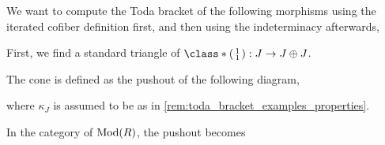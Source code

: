 \begin{example}
	\label{ex:toda_bracket_4}
	We want to compute the Toda bracket of the following morphisms using the iterated cofiber definition first, and then using the indeterminacy afterwards,
	\begin{center}
	\end{center}

	First, we find a standard triangle of \( \class*{\begin{psmallmatrix} 1 \\ 1 \end{psmallmatrix}}: J \to J \oplus J \).

	The cone is defined as the pushout of the following diagram,
	\begin{center}
	\end{center}
	where \( \kappa_J \) is assumed to be as in \autoref{rem:toda_bracket_examples_properties}.

	In the category of \( \operatorname{Mod}(R) \), the pushout becomes
	\begin{center}
\end{center}
\end{example}
